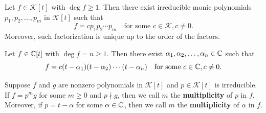 \begin{corollaryenv}
    Let $f\in \mathcal K[t]$ with $\deg f \ge 1$. Then there exist irreducible monic polynomials $p_1, p_2, \ldots, p_m$ in $\mathcal K[t]$ such that
    $$ f=c p_1 p_2 \cdots p_m \quad \text{for some } c\in \mathcal K, c\ne 0. $$ Moreover, such factorization is unique up to the order of the factors.
\end{corollaryenv}
\begin{corollaryenv}
    Let $f\in \mathbb{C}[t]$ with $\deg f = n\ge 1$. Then there exist $\alpha_1, \alpha_2, \ldots, \alpha_n \in \mathbb{C}$ such that
    $$ f = c (t - \alpha_1)(t - \alpha_2) \cdots (t - \alpha_n) \quad \text{for some } c\in \mathbb{C}, c\ne 0. $$
\end{corollaryenv}
\begin{definitionenv}
    Suppose $f$ and $g$ are nonzero polynomials in $\mathcal K[t]$ and $p\in \mathcal K[t]$ is irreducible. If $f=p^m g$ for some $m\ge 0$ and $p \nmid g$, then we call $m$ the \textbf{multiplicity} of $p$ in $f$. Moreover, if $p=t-\alpha$ for some $\alpha \in \mathbb{C}$, then we call $m$ the \textbf{multiplicity} of $\alpha$ in $f$.
\end{definitionenv}


